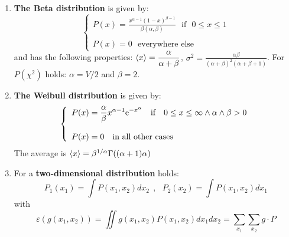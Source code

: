 \documentclass[twoside]{report}
\begin{document}
\begin{enumerate}
\[\begin{array}{l}
      \end{array}\right.
      \]
      with $\alpha>0$ and $\beta>0$. The distribution has the following
      properties: $\av{x}=\alpha\beta$, $\sigma^2=\alpha\beta^2$.
\item {\bf The Beta distribution} is given by:
      \[
      \left\{\begin{array}{l}\displaystyle
      P(x)=\frac{x^{\alpha-1}(1-x)^{\beta-1}}{\beta(\alpha,\beta)}~~~\mbox{if}~~~0\leq x\leq1\\
      \\
      P(x)=0~~~\mbox{everywhere else}
      \end{array}\right.
      \]
      and has the following properties: $\displaystyle\left\langle x \right\rangle=\frac{\alpha}{\alpha+\beta}$,
      $\displaystyle\sigma^2=\frac{\alpha\beta}{(\alpha+\beta)^2(\alpha+\beta+1)}$.
      \npar
      For $P(\chi^2)$ holds: $\alpha=V/2$ and $\beta=2$.
\item {\bf The Weibull distribution} is given by:
      \[
      \left\{\begin{array}{l}\displaystyle
      P(x)=\frac{\alpha}{\beta}x^{\alpha-1}{\rm e}^{-x^\alpha}~~~\mbox{if}~~~0\leq x\leq\infty\wedge\alpha\wedge\beta>0\\
      \\
      P(x)=0~~~\mbox{in all other cases}
      \end{array}\right.
      \]
      The average is $\left\langle x \right\rangle=\beta^{1/\alpha}\Gamma((\alpha+1)\alpha)$
\item For a {\bf two-dimensional distribution} holds:
      \[
      P_1(x_1)=\int P(x_1,x_2)dx_2~~,~~~P_2(x_2)=\int P(x_1,x_2)dx_1
      \]
      with
      \[
      \varepsilon(g(x_1,x_2))=\iint g(x_1,x_2)P(x_1,x_2)dx_1dx_2=\sum_{x_1}\sum_{x_2}g\cdot P
      \]
\end{enumerate}
\end{document}
